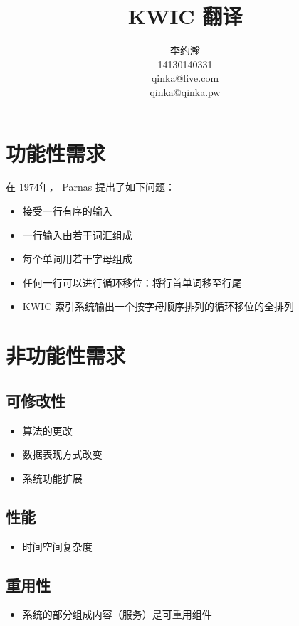 \documentclass{ctexart}
\author{李约瀚 \\ 14130140331 \\ qinka@live.com \\ qinka@qinka.pw}
\title{KWIC 翻译}
\begin{document}
\maketitle

\section{功能性需求}

在 1974年， Parnas 提出了如下问题：
\begin{itemize}
    \item 接受一行有序的输入
    \item 一行输入由若干词汇组成
    \item 每个单词用若干字母组成
    \item 任何一行可以进行循环移位：将行首单词移至行尾
    \item KWIC 索引系统输出一个按字母顺序排列的循环移位的全排列
\end{itemize}

\section{非功能性需求}

\subsection{可修改性}
\begin{itemize}
    \item 算法的更改
    \item 数据表现方式改变
    \item 系统功能扩展
\end{itemize}

\subsection{性能}
\begin{itemize}
    \item 时间空间复杂度
\end{itemize}
\subsection{重用性}
\begin{itemize}
    \item 系统的部分组成内容（服务）是可重用组件
\end{itemize}
\end{document}
